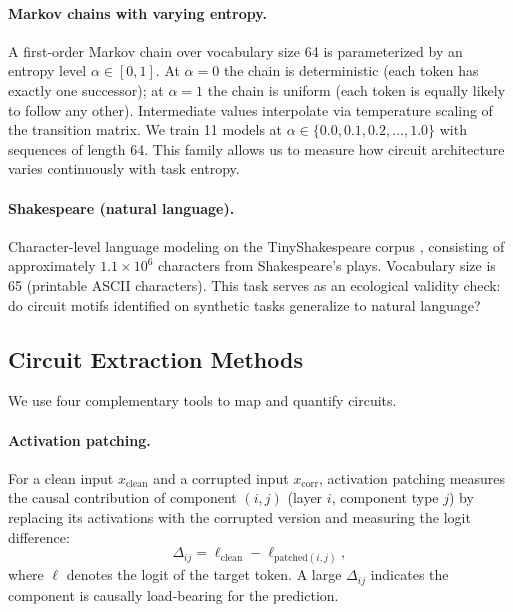 \paragraph{Markov chains with varying entropy.}
A first-order Markov chain over vocabulary size 64 is parameterized by an entropy level
$\alpha \in [0, 1]$. At $\alpha = 0$ the chain is deterministic (each token has exactly one
successor); at $\alpha = 1$ the chain is uniform (each token is equally likely to follow any
other). Intermediate values interpolate via temperature scaling of the transition matrix.
We train 11 models at $\alpha \in \{0.0, 0.1, 0.2, \ldots, 1.0\}$ with sequences of length 64.
This family allows us to measure how circuit architecture varies continuously with task entropy.

\paragraph{Shakespeare (natural language).}
Character-level language modeling on the TinyShakespeare corpus \cite{karpathy2015char},
consisting of approximately $1.1 \times 10^6$ characters from Shakespeare's plays.
Vocabulary size is 65 (printable ASCII characters). This task serves as an ecological validity
check: do circuit motifs identified on synthetic tasks generalize to natural language?

\subsection{Circuit Extraction Methods}
\label{sec:circuit_methods}

We use four complementary tools to map and quantify circuits.

\paragraph{Activation patching.}
For a clean input $x_{\text{clean}}$ and a corrupted input $x_{\text{corr}}$, activation
patching measures the causal contribution of component $(i, j)$ (layer $i$, component type $j$)
by replacing its activations with the corrupted version and measuring the logit difference:
\begin{equation}
\label{eq:patching}
\Delta_{ij} = \ell_{\text{clean}} - \ell_{\text{patched}(i,j)},
\end{equation}
where $\ell$ denotes the logit of the target token. A large $\Delta_{ij}$ indicates the component
is causally load-bearing for the prediction.

